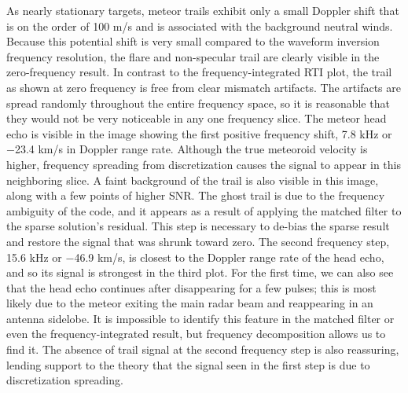 As nearly stationary targets, meteor trails exhibit only a small Doppler shift that is on the order of 100 m/s and is associated with the background neutral winds. Because this potential shift is very small compared to the waveform inversion frequency resolution, the flare and non-specular trail are clearly visible in the zero-frequency result. In contrast to the frequency-integrated RTI plot, the trail as shown at zero frequency is free from clear mismatch artifacts. The artifacts are spread randomly throughout the entire frequency space, so it is reasonable that they would not be very noticeable in any one frequency slice. The meteor head echo is visible in the image showing the first positive frequency shift, 7.8 kHz or $-$23.4 km/s in Doppler range rate. Although the true meteoroid velocity is higher, frequency spreading from discretization causes the signal to appear in this neighboring slice. A faint background of the trail is also visible in this image, along with a few points of higher SNR. The ghost trail is due to the frequency ambiguity of the code, and it appears as a result of applying the matched filter to the sparse solution's residual. This step is necessary to de-bias the sparse result and restore the signal that was shrunk toward zero. The second frequency step, 15.6 kHz or $-$46.9 km/s, is closest to the Doppler range rate of the head echo, and so its signal is strongest in the third plot. For the first time, we can also see that the head echo continues after disappearing for a few pulses; this is most likely due to the meteor exiting the main radar beam and reappearing in an antenna sidelobe. It is impossible to identify this feature in the matched filter or even the frequency-integrated result, but frequency decomposition allows us to find it. The absence of trail signal at the second frequency step is also reassuring, lending support to the theory that the signal seen in the first step is due to discretization spreading.

